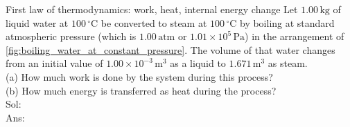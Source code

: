 \begin{practicebox}{First law of thermodynamics: work, heat, internal energy change}
\boilingwateratconstantpressure
{}%
Let $1.00\,\mathrm{kg}$ of liquid water at $100\,^\circ\mathrm{C}$
be converted to steam
at $100\,^\circ\mathrm{C}$ by boiling at standard atmospheric pressure
(which is $1.00\,\mathrm{atm}$ or $1.01 \times 10^{5}\,\mathrm{Pa}$)
in the arrangement of \autoref{fig:boiling_water_at_constant_pressure}.
The volume of that water changes from an initial value of
$1.00 \times 10^{-3}\,\mathrm{m^3}$ as a liquid to
$1.671\,\mathrm{m^3}$ as steam. \\
(a) How much work is done by the system during this process? \\
(b) How much energy is transferred as heat during the process? \\
%
Sol: \\
Ans:
\end{practicebox}
\clearpage